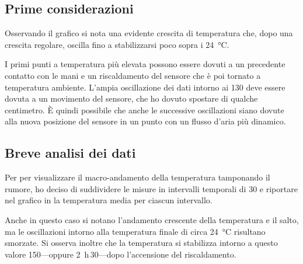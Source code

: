         \subsection{Prime considerazioni}
            Osservando il grafico si nota una evidente crescita di temperatura che, dopo una crescita regolare, oscilla fino a stabilizzarsi poco sopra i \SI{24}{\celsius}.
            
            I primi punti a temperatura più elevata possono essere dovuti a un precedente contatto con le mani e un riscaldamento del sensore che è poi tornato a temperatura ambiente. L'ampia oscillazione dei dati intorno ai \SI{130}{\min} deve essere dovuta a un movimento del sensore, che ho dovuto spostare di qualche centimetro. È quindi possibile che anche le successive oscillazioni siano dovute alla nuova posizione del sensore in un punto con un flusso d'aria più dinamico.
        \subsection{Breve analisi dei dati}
            Per per visualizzare il macro-andamento della temperatura tamponando il rumore, ho deciso di suddividere le misure in intervalli temporali di \SI{30}{\min} e riportare nel grafico in  la temperatura media per ciascun intervallo.

            Anche in questo caso si notano l'andamento crescente della temperatura e il salto, ma le oscillazioni intorno alla temperatura finale di circa \SI{24}{\celsius} risultano smorzate. Si osserva inoltre che la temperatura si stabilizza intorno a questo valore \SI{150}{\min}---oppure  \SI{2}{\hour}\,\SI{30}{\min}---dopo l'accensione del riscaldamento.
            

